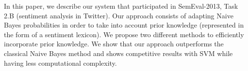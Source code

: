 In this paper, we describe our system that participated in SemEval-2013, Task 2.B (sentiment analysis in Twitter). Our approach consists of adapting Naive
 Bayes probabilities in order to take into account prior knowledge (represented
 in the form of a sentiment lexicon). We propose two different methods to
 efficiently incorporate prior knowledge. We show that our approach outperforms
 the classical Naive Bayes method and shows competitive results with SVM while
 having less computational complexity.

